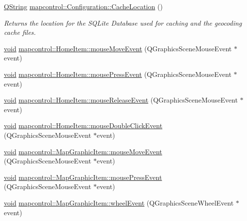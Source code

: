 \begin{DoxyCompactItemize}
\hyperlink{group___u_a_v_objects_plugin_gab9d252f49c333c94a72f97ce3105a32d}{Q\-String} \hyperlink{group___o_p_map_widget_ga1edc453f938348b4b2400fe6310bae75}{mapcontrol\-::\-Configuration\-::\-Cache\-Location} ()
\begin{DoxyCompactList}\small\item\em Returns the location for the S\-Q\-Lite Database used for caching and the geocoding cache files. \end{DoxyCompactList}\item 
\hyperlink{group___u_a_v_objects_plugin_ga444cf2ff3f0ecbe028adce838d373f5c}{void} \hyperlink{group___o_p_map_widget_ga547e723911d9f309c53c587dae90002a}{mapcontrol\-::\-Home\-Item\-::mouse\-Move\-Event} (Q\-Graphics\-Scene\-Mouse\-Event $\ast$event)
\item 
\hyperlink{group___u_a_v_objects_plugin_ga444cf2ff3f0ecbe028adce838d373f5c}{void} \hyperlink{group___o_p_map_widget_ga312ac9d1cba702ca33ba3f6fbc883bb1}{mapcontrol\-::\-Home\-Item\-::mouse\-Press\-Event} (Q\-Graphics\-Scene\-Mouse\-Event $\ast$event)
\item 
\hyperlink{group___u_a_v_objects_plugin_ga444cf2ff3f0ecbe028adce838d373f5c}{void} \hyperlink{group___o_p_map_widget_gabab0d6bb38eaad0414451df469b7dee2}{mapcontrol\-::\-Home\-Item\-::mouse\-Release\-Event} (Q\-Graphics\-Scene\-Mouse\-Event $\ast$event)
\item 
\hyperlink{group___u_a_v_objects_plugin_ga444cf2ff3f0ecbe028adce838d373f5c}{void} \hyperlink{group___o_p_map_widget_ga422b8f29836c5a4bafc485a6330408d8}{mapcontrol\-::\-Home\-Item\-::mouse\-Double\-Click\-Event} (Q\-Graphics\-Scene\-Mouse\-Event $\ast$event)
\item 
\hyperlink{group___u_a_v_objects_plugin_ga444cf2ff3f0ecbe028adce838d373f5c}{void} \hyperlink{group___o_p_map_widget_ga60c7e55c1ee2c957be5233e999912521}{mapcontrol\-::\-Map\-Graphic\-Item\-::mouse\-Move\-Event} (Q\-Graphics\-Scene\-Mouse\-Event $\ast$event)
\item 
\hyperlink{group___u_a_v_objects_plugin_ga444cf2ff3f0ecbe028adce838d373f5c}{void} \hyperlink{group___o_p_map_widget_ga6f27143f563d9f5bb72d36e06078f488}{mapcontrol\-::\-Map\-Graphic\-Item\-::mouse\-Press\-Event} (Q\-Graphics\-Scene\-Mouse\-Event $\ast$event)
\item 
\hyperlink{group___u_a_v_objects_plugin_ga444cf2ff3f0ecbe028adce838d373f5c}{void} \hyperlink{group___o_p_map_widget_ga93a150c4f1ed84aa194b153b55bc9cd3}{mapcontrol\-::\-Map\-Graphic\-Item\-::wheel\-Event} (Q\-Graphics\-Scene\-Wheel\-Event $\ast$event)
\item 

\end{DoxyCompactItemize}
